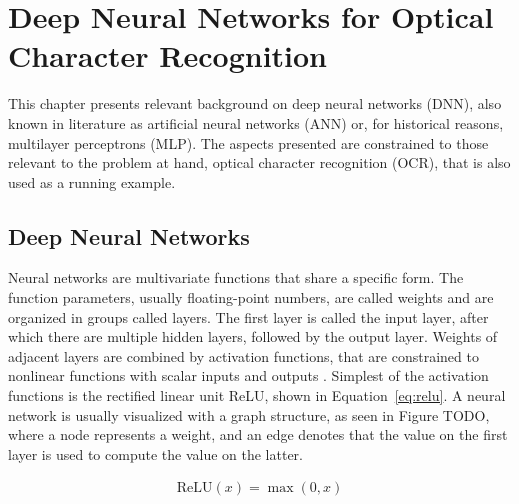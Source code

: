 \documentclass{article}
\begin{document}

\section{Deep Neural Networks for Optical Character Recognition}


This chapter presents relevant background on deep neural networks (DNN), also known 
in literature as artificial neural networks (ANN) or, for historical reasons, multilayer perceptrons (MLP).
The aspects presented are constrained to those relevant to the problem at hand, optical character recognition (OCR),
that is also used as a running example.

\subsection{Deep Neural Networks}


Neural networks are multivariate functions that share a specific form.
The function parameters, usually floating-point numbers, are called weights and are organized in groups called layers.
The first layer is called the input layer, after which there are multiple hidden layers, followed by the output layer.
Weights of adjacent layers are combined by activation functions, that are constrained to nonlinear functions with 
scalar inputs and outputs \cite{princebook}. Simplest of the activation functions is the rectified
linear unit ReLU, shown in Equation~\ref{eq:relu}. A neural network is usually visualized with a graph structure, as seen in Figure TODO, where a node represents a 
weight, and an edge denotes that the value on the first layer is used to compute the value on the latter.

\begin{align}
\text{ReLU}(x) = \max(0, x)
\label{eq:relu}
\end{align}

\end{document}
